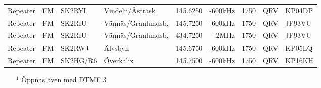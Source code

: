 \begin{landscape}
\begin{longtable}{llllrrlcl}
Repeater                          & FM            & SK2RYI        & Vindeln/Åsträsk     & 145.6250          & -600kHz        & 1750             & QRV             & KP04DP           \\
Repeater                          & FM            & SK2RIU        & Vännäs/Granlundsb.  & 145.7250          & -600kHz        & 1750             & QRV             & JP93VU           \\
Repeater                          & FM            & SK2RIU        & Vännäs/Granlundsb.  & 434.7250          & -2MHz          & 1750             & QRV             & JP93VU           \\
Repeater                          & FM            & SK2RWJ        & Älvsbyn             & 145.6750          & -600kHz        & 1750             & QRV             & KP05LQ           \\
Repeater                          & FM            & SK2HG/R6      & Överkalix           & 145.7500          & -600kHz        & 1750             & QRV             & KP16KH
\end{longtable}
\begin{itemize}
	\item[$^1$] Öppnas även med DTMF 3
\end{itemize}
\normalsize

\end{landscape}
